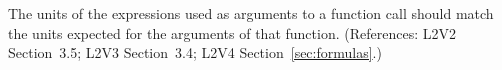 The units of the expressions used as arguments to a function call
should match the units expected for the arguments of that function.
(References: L2V2 Section~3.5; L2V3 Section~3.4; L2V4 Section~\ref{sec:formulas}.)
